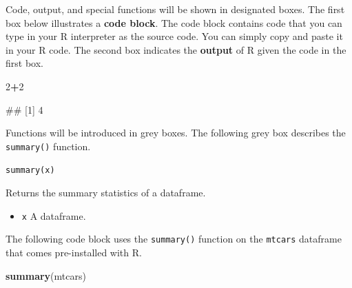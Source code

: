 \documentclass[
]{book}
\newenvironment{Shaded}{\begin{snugshade}}{\end{snugshade}}
\newcommand{\DecValTok}[1]{\textcolor[rgb]{0.00,0.00,0.81}{#1}}
\newcommand{\FunctionTok}[1]{\textcolor[rgb]{0.13,0.29,0.53}{\textbf{#1}}}
\newcommand{\NormalTok}[1]{#1}
\newcommand{\SpecialCharTok}[1]{\textcolor[rgb]{0.81,0.36,0.00}{\textbf{#1}}}
\providecommand{\tightlist}{%
  \setlength{\itemsep}{0pt}\setlength{\parskip}{0pt}}
\begin{document}
Code, output, and special functions will be shown in designated boxes. The first box below illustrates a \textbf{code block}. The code block contains code that you can type in your R interpreter as the source code. You can simply copy and paste it in your R code. The second box indicates the \textbf{output} of R given the code in the first box.

\begin{Shaded}
\begin{Highlighting}[]
\DecValTok{2}\SpecialCharTok{+}\DecValTok{2}
\end{Highlighting}
\end{Shaded}

\begin{Shaded}
\begin{Highlighting}[]
\NormalTok{\#\# [1] 4}
\end{Highlighting}
\end{Shaded}

Functions will be introduced in grey boxes. The following grey box describes the \texttt{summary()} function.

\texttt{summary(x)}

Returns the summary statistics of a dataframe.

\begin{itemize}
\tightlist
\item
  \texttt{x} A dataframe.
\end{itemize}

\hfill\break
\hfill\break
The following code block uses the \texttt{summary()} function on the \texttt{mtcars} dataframe that comes pre-installed with R.

\begin{Shaded}
\begin{Highlighting}[]
\FunctionTok{summary}\NormalTok{(mtcars)}
\end{Highlighting}
\end{Shaded}
\end{document}
